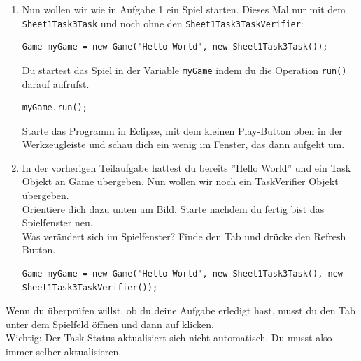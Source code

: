 
\label{ex3}

\begin{enumerate}
    \item Nun wollen wir wie in Aufgabe 1 ein Spiel starten.
        Dieses Mal nur mit dem \lstinline{Sheet1Task3Task} und noch ohne den \lstinline{Sheet1Task3TaskVerifier}:

    \begin{lstlisting}
Game myGame = new Game("Hello World", new Sheet1Task3Task());
    \end{lstlisting}

    Du startest das Spiel in der Variable \lstinline{myGame} indem du die Operation \lstinline{run()} darauf aufrufst.

    \begin{lstlisting}
myGame.run();
    \end{lstlisting}

    Starte das Programm in Eclipse, mit dem kleinen Play-Button oben in der Werkzeugleiste und schau dich ein wenig im Fenster, das dann aufgeht um.

    \vspace{5mm}

    \item In der vorherigen Teilaufgabe hattest du bereits ''Hello World'' und ein Task Objekt an Game übergeben.
        Nun wollen wir noch ein TaskVerifier Objekt übergeben.\\
        Orientiere dich dazu unten am Bild. Starte nachdem du fertig bist das Spielfenster neu. \\

        Was verändert sich im Spielfenster?
        Finde den  Tab und drücke den Refresh Button.

    \begin{lstlisting}
Game myGame = new Game("Hello World", new Sheet1Task3Task(), new Sheet1Task3TaskVerifier());
    \end{lstlisting}

\end{enumerate}


\begin{Infobox}
    Wenn du überprüfen willst, ob du deine Aufgabe erledigt hast, musst du den  Tab unter dem Spielfeld öffnen und dann auf  klicken.\\

    Wichtig: Der Task Status aktualisiert sich nicht automatisch. Du musst also immer selber aktualisieren.
\end{Infobox}


